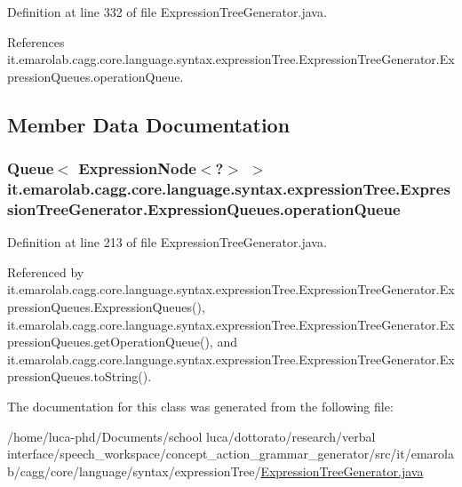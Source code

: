 Definition at line 332 of file Expression\-Tree\-Generator.\-java.



References it.\-emarolab.\-cagg.\-core.\-language.\-syntax.\-expression\-Tree.\-Expression\-Tree\-Generator.\-Expression\-Queues.\-operation\-Queue.



\subsection{Member Data Documentation}
\hypertarget{classit_1_1emarolab_1_1cagg_1_1core_1_1language_1_1syntax_1_1expressionTree_1_1ExpressionTreeGenerator_1_1ExpressionQueues_a1d79417f8bae0ed4313b55f48987affa}{
\subsubsection[{operation\-Queue}]{\setlength{\rightskip}{0pt plus 5cm}Queue$<$ Expression\-Node$<$?$>$ $>$ it.\-emarolab.\-cagg.\-core.\-language.\-syntax.\-expression\-Tree.\-Expression\-Tree\-Generator.\-Expression\-Queues.\-operation\-Queue\hspace{0.3cm}{\ttfamily [private]}}}\label{classit_1_1emarolab_1_1cagg_1_1core_1_1language_1_1syntax_1_1expressionTree_1_1ExpressionTreeGenerator_1_1ExpressionQueues_a1d79417f8bae0ed4313b55f48987affa}


Definition at line 213 of file Expression\-Tree\-Generator.\-java.



Referenced by it.\-emarolab.\-cagg.\-core.\-language.\-syntax.\-expression\-Tree.\-Expression\-Tree\-Generator.\-Expression\-Queues.\-Expression\-Queues(), it.\-emarolab.\-cagg.\-core.\-language.\-syntax.\-expression\-Tree.\-Expression\-Tree\-Generator.\-Expression\-Queues.\-get\-Operation\-Queue(), and it.\-emarolab.\-cagg.\-core.\-language.\-syntax.\-expression\-Tree.\-Expression\-Tree\-Generator.\-Expression\-Queues.\-to\-String().



The documentation for this class was generated from the following file\-:\begin{DoxyCompactItemize}
\item 
/home/luca-\/phd/\-Documents/school luca/dottorato/research/verbal interface/speech\-\_\-workspace/concept\-\_\-action\-\_\-grammar\-\_\-generator/src/it/emarolab/cagg/core/language/syntax/expression\-Tree/\hyperlink{ExpressionTreeGenerator_8java}{Expression\-Tree\-Generator.\-java}\end{DoxyCompactItemize}
